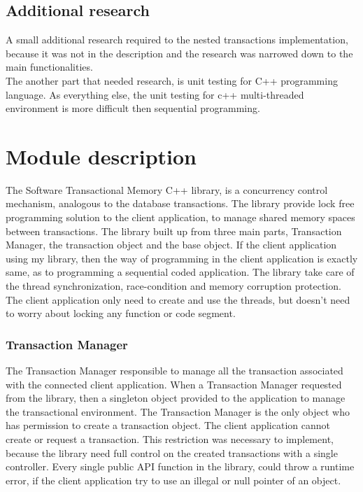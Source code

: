 \documentclass[12pt]{article}
\begin{document}
\subsection{Additional research}
A small additional research required to the nested transactions implementation, because it was not in the description and the research was narrowed down to the main functionalities.\\
The another part that needed research, is unit testing for C++ programming language.\cite{cookbook} As everything else, the unit testing for c++ multi-threaded environment is more difficult then sequential programming.

\section{Module description}
The Software Transactional Memory C++ library, is a concurrency control mechanism, analogous to the database transactions. The library provide lock free programming solution to the client application, to manage shared memory spaces between transactions. The library built up from three main parts, Transaction Manager, the transaction object and the base object. If the client application using my library, then the way of programming in the client application is exactly same, as to programming a sequential coded application. The library take care of the thread synchronization, race-condition and memory corruption protection. The client application only need to create and use the threads, but doesn't need to worry about locking any function or code segment.   


\subsubsection{Transaction Manager}
The Transaction Manager responsible to manage all the transaction associated with the connected client application. When a Transaction Manager requested from the library, then a singleton object provided to the application to manage the transactional environment. The Transaction Manager is the only object who has permission to create a transaction object. The client application cannot create or request a transaction. This restriction was necessary to implement, because the library need full control on the created transactions with a single controller. Every single public API function in the library, could throw a runtime error, if the client application try to use an illegal or null pointer of an object.\\
\end{document}
